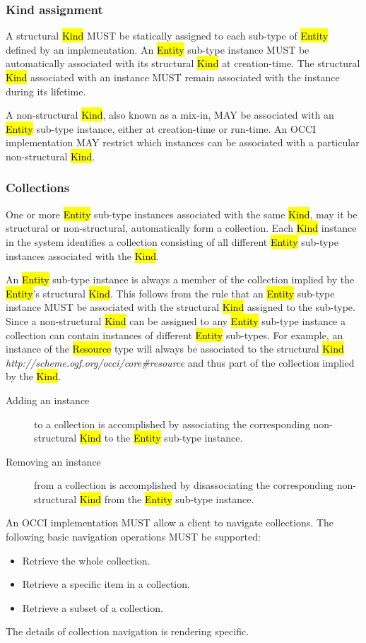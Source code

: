 \documentclass[10pt,a4paper,british]{article}
\begin{document}
\subsubsection{Kind assignment}
\label{sec:type_assignment}
A structural \hl{Kind} MUST be statically assigned to each sub-type of
\hl{Entity} defined by an implementation. An \hl{Entity} sub-type instance MUST be
automatically associated with its structural \hl{Kind} at creation-time.  The
structural \hl{Kind} associated with an instance MUST remain associated with the
instance during its lifetime.

A non-structural \hl{Kind}, also known as a mix-in, MAY be associated with an
\hl{Entity} sub-type instance, either at creation-time or run-time. An OCCI
implementation MAY restrict which instances can be associated with a particular
non-structural \hl{Kind}.

\subsubsection{Collections}
\label{sec:collection}
One or more \hl{Entity} sub-type instances associated with the same \hl{Kind},
may it be structural or non-structural, automatically form a collection.
Each \hl{Kind} instance in the system identifies a collection consisting of all
different \hl{Entity} sub-type instances associated with the \hl{Kind}.

An \hl{Entity} sub-type instance is always a member of the collection implied
by the \hl{Entity}'s structural \hl{Kind}. This follows from the rule that an
\hl{Entity} sub-type instance MUST be associated with the structural \hl{Kind}
assigned to the sub-type.
Since a non-structural \hl{Kind} can be assigned to any \hl{Entity} sub-type
instance a collection can contain instances of different \hl{Entity} sub-types.
%
For example, an instance of the \hl{Resource} type will always be associated
to the structural \hl{Kind}
\textit{http://scheme.ogf.org/occi/core\#resource} and thus part of the
collection implied by the \hl{Kind}.
\begin{description}
\item[Adding an instance] to a collection is accomplished by associating the
corresponding non-structural \hl{Kind} to the \hl{Entity} sub-type instance.
\item[Removing an instance] from a collection is accomplished by disassociating the
corresponding non-structural \hl{Kind} from the \hl{Entity} sub-type instance.
\end{description}
%
An OCCI implementation MUST allow a client to navigate collections. The
following basic navigation operations MUST be supported:
\begin{itemize}
\item Retrieve the whole collection.
\item Retrieve a specific item in a collection.
\item Retrieve a subset of a collection.
\end{itemize}
The details of collection navigation is rendering specific.
\end{document}
